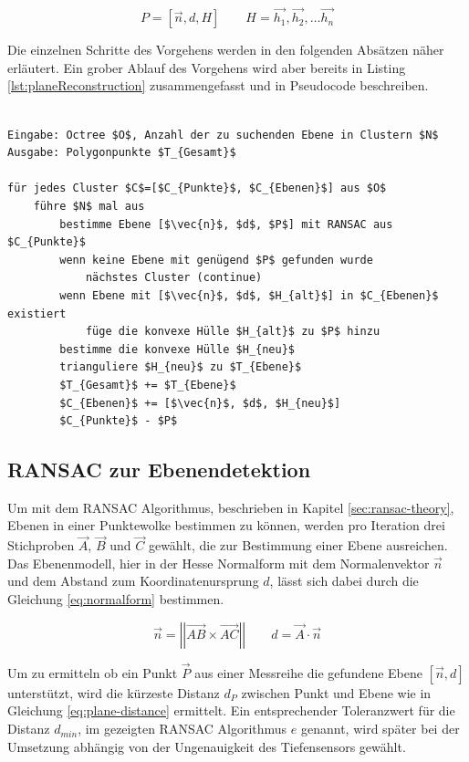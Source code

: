 \begin{equation} \label{eq:plane}
P=\left[\vec{n}, d, H\right] \qquad H=\vec{h_1}, \vec{h_2}, \ldots  \vec{h_n}
\end{equation}

Die einzelnen Schritte des Vorgehens werden in den folgenden Absätzen näher erläutert. Ein grober Ablauf des Vorgehens wird aber bereits in Listing \ref{lst:planeReconstruction} zusammengefasst und in Pseudocode beschreiben. 

\begin{lstlisting}[mathescape,caption=Planare Echtzeit Rekonstruktion, label=lst:planeReconstruction, float=htbp]

Eingabe: Octree $O$, Anzahl der zu suchenden Ebene in Clustern $N$
Ausgabe: Polygonpunkte $T_{Gesamt}$

für jedes Cluster $C$=[$C_{Punkte}$, $C_{Ebenen}$] aus $O$
    führe $N$ mal aus
        bestimme Ebene [$\vec{n}$, $d$, $P$] mit RANSAC aus $C_{Punkte}$
        wenn keine Ebene mit genügend $P$ gefunden wurde
            nächstes Cluster (continue)
        wenn Ebene mit [$\vec{n}$, $d$, $H_{alt}$] in $C_{Ebenen}$ existiert	
            füge die konvexe Hülle $H_{alt}$ zu $P$ hinzu	
        bestimme die konvexe Hülle $H_{neu}$
        trianguliere $H_{neu}$ zu $T_{Ebene}$
        $T_{Gesamt}$ += $T_{Ebene}$
        $C_{Ebenen}$ += [$\vec{n}$, $d$, $H_{neu}$]
        $C_{Punkte}$ - $P$
\end{lstlisting}


\subsection{RANSAC zur Ebenendetektion} \label{sec:ransac}

Um mit dem RANSAC Algorithmus, beschrieben in Kapitel \ref{sec:ransac-theory}, Ebenen in einer Punktewolke bestimmen zu können, werden pro Iteration drei Stichproben \(\vec{A}\), \(\vec{B}\) und \(\vec{C}\) gewählt, die zur Bestimmung einer Ebene ausreichen. Das Ebenenmodell, hier in der Hesse Normalform mit dem Normalenvektor \(\vec{n}\) und dem Abstand zum Koordinatenursprung \(d\), lässt sich dabei durch die Gleichung \ref{eq:normalform} bestimmen.

\begin{equation}\label{eq:normalform}
\vec{n} =\left|\left| \vec{AB} \times \vec{AC}\right|\right|
\qquad
d = \vec{A} \cdot \vec{n}
\end{equation}

Um zu ermitteln ob ein Punkt \(\vec{P}\) aus einer Messreihe die gefundene Ebene \(\left[\vec{n}, d\right]\) unterstützt, wird die kürzeste Distanz \(d_P\) zwischen Punkt und Ebene wie in Gleichung \ref{eq:plane-distance} ermittelt.  Ein entsprechender Toleranzwert für die Distanz \(d_{min}\), im gezeigten RANSAC Algorithmus \(e\) genannt, wird später bei der Umsetzung abhängig von der Ungenauigkeit des Tiefensensors gewählt. 

